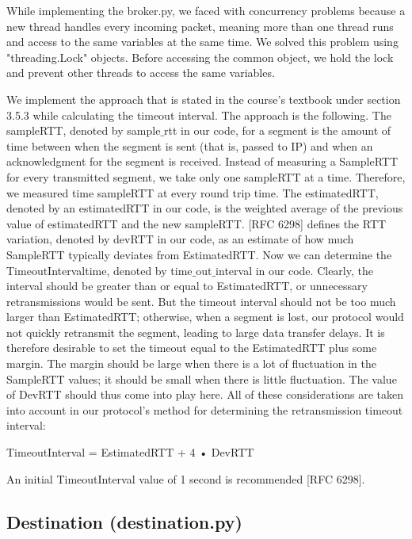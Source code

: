\documentclass[conference]{IEEEtran}
\begin{document}
While implementing the broker.py, we faced with concurrency problems because a new thread handles every incoming packet, meaning more than one thread runs and access to the same variables at the same time. We solved this problem using "threading.Lock" objects. Before accessing the common object, we hold the lock and prevent other threads to access the same variables.

We implement the approach that is stated in the course's textbook under section 3.5.3 while calculating the timeout interval. The approach is the following. The sampleRTT, denoted by sample$\_$rtt in our code, for a segment is the amount of time between when the segment is sent (that is, passed to IP) and when an acknowledgment for the segment is received. Instead of measuring a SampleRTT for every transmitted segment, we take only one sampleRTT at a time. Therefore, we measured time sampleRTT at every round trip time. The estimatedRTT, denoted by an estimatedRTT in our code, is the weighted average of the previous value of estimatedRTT and the new sampleRTT. [RFC 6298] defines the RTT variation, denoted by devRTT in our code, as an estimate of how much SampleRTT typically deviates from EstimatedRTT. Now we can determine the TimeoutIntervaltime, denoted by  time$\_$out$\_$interval in our code. Clearly, the interval should be greater than or equal to EstimatedRTT, or unnecessary retransmissions would be sent. But the timeout interval should not be too much larger than EstimatedRTT; otherwise, when a segment is lost, our protocol would not quickly retransmit the segment, leading to large data transfer delays. It is therefore desirable to set the timeout equal to the EstimatedRTT plus
some margin. The margin should be large when there is a lot of fluctuation in the SampleRTT values; it should be small when there is little fluctuation. The value of DevRTT should thus come into play here. All of these considerations are taken into account in our protocol’s method for determining the retransmission timeout interval:

TimeoutInterval = EstimatedRTT + 4 • DevRTT

An initial TimeoutInterval value of 1 second is recommended [RFC 6298].


\subsection{Destination (destination.py)}
\end{document}
